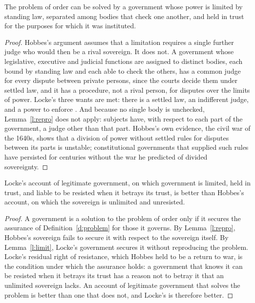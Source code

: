 \documentclass{situationist-preprint}
\begin{document}
\begin{lemma}\label{l:limit}
The problem of order can be solved by a government whose power is limited by standing law, separated among bodies that check one another, and held in trust for the purposes for which it was instituted.
\end{lemma}

\begin{proof}
Hobbes's argument assumes that a limitation requires a single further judge who would then be a rival sovereign. It does not. A government whose legislative, executive and judicial functions are assigned to distinct bodies, each bound by standing law and each able to check the others, has a common judge for every dispute between private persons, since the courts decide them under settled law, and it has a procedure, not a rival person, for disputes over the limits of power. Locke's three wants are met: there is a settled law, an indifferent judge, and a power to enforce \citep[\S\S 124--131]{Locke1689}. And because no single body is unchecked, Lemma~\ref{l:repro} does not apply: subjects have, with respect to each part of the government, a judge other than that part. Hobbes's own evidence, the civil war of the 1640s, shows that a division of power without settled rules for disputes between its parts is unstable; constitutional governments that supplied such rules have persisted for centuries without the war he predicted of divided sovereignty.
\end{proof}

\begin{theorem}\label{t:solution}
Locke's account of legitimate government, on which government is limited, held in trust, and liable to be resisted when it betrays its trust, is better than Hobbes's account, on which the sovereign is unlimited and unresisted.
\end{theorem}

\begin{proof}
A government is a solution to the problem of order only if it secures the assurance of Definition~\ref{d:problem} for those it governs. By Lemma~\ref{l:repro}, Hobbes's sovereign fails to secure it with respect to the sovereign itself. By Lemma~\ref{l:limit}, Locke's government secures it without reproducing the problem. Locke's residual right of resistance, which Hobbes held to be a return to war, is the condition under which the assurance holds: a government that knows it can be resisted when it betrays its trust has a reason not to betray it that an unlimited sovereign lacks. An account of legitimate government that solves the problem is better than one that does not, and Locke's is therefore better.
\end{proof}
\end{document}
